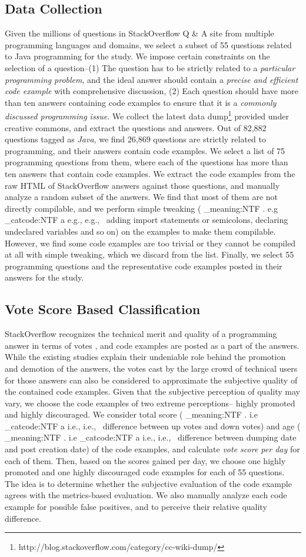\documentclass{sig-alternate}
\makeatletter
\newcommand\latinabbrev[1]{
  \peek_meaning:NTF . {%
    #1\@}%
  { \peek_catcode:NTF a {%
      #1., \@ }%
    {#1., \@}}}
\def\eg{\latinabbrev{e.g}}
\def\ie{\latinabbrev{i.e}}
\makeatother
\begin{document}
\subsection{Data Collection}
Given the millions of questions in StackOverflow Q \& A site from multiple programming languages and domains, we select a subset of 55 questions related to Java programming for the study. We impose certain constraints on the selection of a question--(1) The question has to be strictly related to a \emph{particular programming problem}, and the ideal answer should contain a \emph{precise and efficient code example} with comprehensive discussion, (2) Each question should have more than ten answers containing code examples to ensure that  it is a \emph{commonly discussed programming issue}. We collect the latest data dump\footnote{http://blog.stackoverflow.com/category/cc-wiki-dump/} provided under creative commons, and extract the questions and answers. Out of 82,882 questions tagged as \emph{Java}, we find 26,869 questions are strictly related to programming, and their answers contain code examples. We select a list of 75 programming questions from them, where each of the questions has more than ten answers that contain code examples. We extract the code examples from the raw HTML of StackOverflow answers against those questions, and manually analyze a random subset of the answers. We find that most of them are not directly compilable, and we perform simple tweaking (\eg\ adding import statements or semicolons, declaring undeclared variables and so on) on the examples to make them compilable. However, we find some code examples are too trivial or they cannot be compiled at all with simple tweaking, which we discard from the list. Finally, we select 55 programming questions and the representative code examples posted in their answers for the study.
\subsection{Vote Score Based Classification}
StackOverflow recognizes the technical merit and quality of a programming answer in terms of votes \cite{nasehi}, and code examples are posted as a part of the answers. While the existing studies \cite{nasehi, nier} explain their undeniable role behind the promotion and demotion of the answers, the votes cast by the large crowd of technical users for those answers can also be considered to approximate the subjective quality of the contained code examples. Given that the subjective perception of quality may vary, we choose the code examples of two extreme perceptions-- highly promoted and highly discouraged. We consider total score (\ie\ difference between up votes and down votes) and age (\ie\ difference between dumping date and post creation date) of the code examples, and calculate \emph{vote score per day} for each of them. Then, based on the scores gained per day, we choose one highly promoted and one highly discouraged code examples for each of 55 questions. The idea is to determine whether the subjective evaluation of the code example agrees with the metrics-based evaluation. We also manually analyze each code example for possible false positives, and to perceive their relative quality difference.
\end{document}
